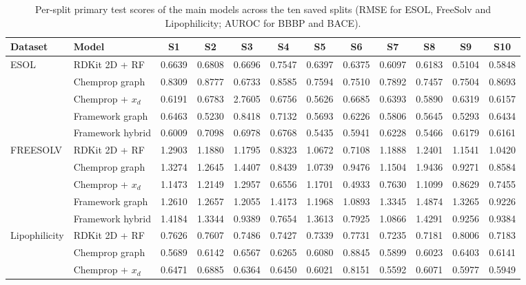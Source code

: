 \documentclass[10pt,a4paper]{article}
\renewcommand{\thetable}{S\arabic{table}}
\begin{document}
\begin{table}[H]
\renewcommand{\thetable}{S14}
\caption{Per-split primary test scores of the main models across the ten saved splits (RMSE for ESOL, FreeSolv and Lipophilicity; AUROC for BBBP and BACE).}\label{tab:splits}
\centering\scriptsize
\setlength{\tabcolsep}{3pt}
\begin{tabular}{@{}llcccccccccc@{}}
\toprule
Dataset & Model & S1 & S2 & S3 & S4 & S5 & S6 & S7 & S8 & S9 & S10 \\
\midrule
ESOL & RDKit 2D + RF & 0.6639 & 0.6808 & 0.6696 & 0.7547 & 0.6397 & 0.6375 & 0.6097 & 0.6183 & 0.5104 & 0.5848 \\
 & Chemprop graph & 0.8309 & 0.8777 & 0.6733 & 0.8585 & 0.7594 & 0.7510 & 0.7892 & 0.7457 & 0.7504 & 0.8693 \\
 & Chemprop + $x_d$ & 0.6191 & 0.6783 & 2.7605 & 0.6756 & 0.5626 & 0.6685 & 0.6393 & 0.5890 & 0.6319 & 0.6157 \\
 & Framework graph & 0.6463 & 0.5230 & 0.8418 & 0.7132 & 0.5693 & 0.6226 & 0.5806 & 0.5645 & 0.5293 & 0.6434 \\
 & Framework hybrid & 0.6009 & 0.7098 & 0.6978 & 0.6768 & 0.5435 & 0.5941 & 0.6228 & 0.5466 & 0.6179 & 0.6161 \\
\midrule
FREESOLV & RDKit 2D + RF & 1.2903 & 1.1880 & 1.1795 & 0.8323 & 1.0672 & 0.7108 & 1.1888 & 1.2401 & 1.1541 & 1.0420 \\
 & Chemprop graph & 1.3274 & 1.2645 & 1.4407 & 0.8439 & 1.0739 & 0.9476 & 1.1504 & 1.9436 & 0.9271 & 0.8584 \\
 & Chemprop + $x_d$ & 1.1473 & 1.2149 & 1.2957 & 0.6556 & 1.1701 & 0.4933 & 0.7630 & 1.1099 & 0.8629 & 0.7455 \\
 & Framework graph & 1.2610 & 1.2657 & 1.2055 & 1.4173 & 1.1968 & 1.0893 & 1.3345 & 1.4874 & 1.3265 & 0.9226 \\
 & Framework hybrid & 1.4184 & 1.3344 & 0.9389 & 0.7654 & 1.3613 & 0.7925 & 1.0866 & 1.4291 & 0.9256 & 0.9384 \\
\midrule
Lipophilicity & RDKit 2D + RF & 0.7626 & 0.7607 & 0.7486 & 0.7427 & 0.7339 & 0.7731 & 0.7235 & 0.7181 & 0.8006 & 0.7183 \\
 & Chemprop graph & 0.5689 & 0.6142 & 0.6567 & 0.6265 & 0.6080 & 0.8845 & 0.5899 & 0.6023 & 0.6403 & 0.6141 \\
 & Chemprop + $x_d$ & 0.6471 & 0.6885 & 0.6364 & 0.6450 & 0.6021 & 0.8151 & 0.5592 & 0.6071 & 0.5977 & 0.5949 \\

\end{tabular}
\end{table}
\end{document}
